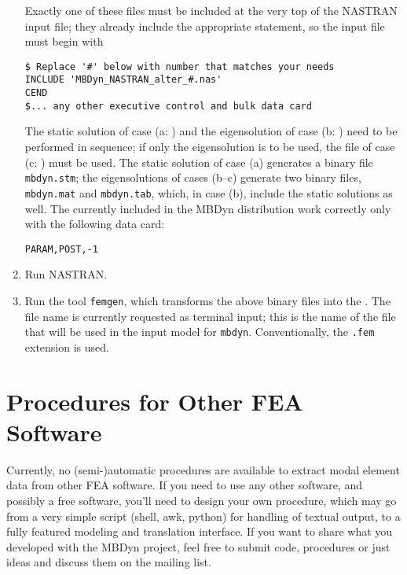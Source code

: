 \begin{enumerate}
\begin{enumerate}
\end{enumerate}
Exactly one of these files must be included at the very top 
of the NASTRAN input file;
they already include the appropriate  statement, so the
input file must begin with
\begin{verbatim}
$ Replace '#' below with number that matches your needs
INCLUDE 'MBDyn_NASTRAN_alter_#.nas'
CEND
$... any other executive control and bulk data card
\end{verbatim}
The static solution of case (a: ) and the eigensolution
of case (b: ) need to be performed in sequence; 
if only the eigensolution is to be used, the  file 
of case (c: ) must be used.
The static solution of case (a) generates a binary file \texttt{mbdyn.stm};
the eigensolutions of cases (b--c) generate two binary files, 
\texttt{mbdyn.mat} and \texttt{mbdyn.tab}, which, in case (b), include
the static solutions as well.
The  currently included in the MBDyn distribution work 
correctly only with the following  data card:
\begin{verbatim}
PARAM,POST,-1 
\end{verbatim}


\item Run NASTRAN.


\item Run the tool \texttt{femgen}, which transforms the above binary files
into the .
The file name is currently requested as terminal input; this is the name 
of the file that will be used in the input model for \texttt{mbdyn}.
Conventionally, the \texttt{.fem} extension is used.

\end{enumerate} %



\section{Procedures for Other FEA Software}
Currently, no (semi-)automatic procedures are available to extract modal
element data from other FEA software.
If you need to use any other software, and possibly a free software,
you'll need to design your own procedure, which may go from a very simple
script (shell, awk, python) for handling of textual output, to a fully
featured modeling and translation interface.
If you want to share what you developed with the MBDyn project, feel free
to submit code, procedures or just ideas and discuss them on the
mailing list.

